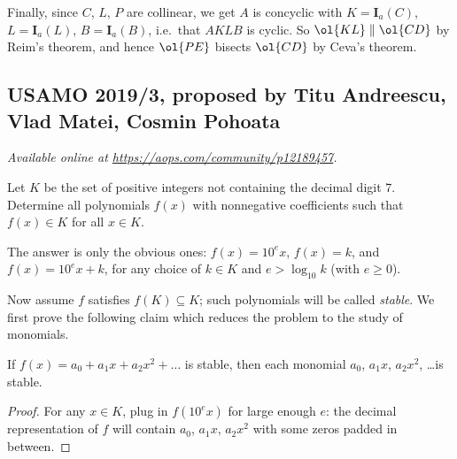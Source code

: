 \documentclass[11pt]{scrartcl}
\begin{document}
Finally, since $C$, $L$, $P$ are collinear,
we get $A$ is concyclic with $K = \mathbf{I}_a(C)$,
$L = \mathbf{I}_a(L)$, $B = \mathbf{I}_a(B)$, i.e.\ that $AKLB$ is cyclic.
So $\ol{KL} \parallel \ol{CD}$ by Reim's theorem,
and hence $\ol{PE}$ bisects $\ol{CD}$ by Ceva's theorem.
\pagebreak

\subsection{USAMO 2019/3, proposed by Titu Andreescu, Vlad Matei, Cosmin Pohoata}
\textsl{Available online at \url{https://aops.com/community/p12189457}.}
\begin{mdframed}[style=mdpurplebox,frametitle={Problem statement}]
Let $K$ be the set of positive integers not containing the decimal digit $7$.
Determine all polynomials $f(x)$ with nonnegative coefficients
such that $f(x) \in K$ for all $x \in K$.
\end{mdframed}
The answer is only the obvious ones:
$f(x) = 10^e x$, $f(x) = k$,
and $f(x) = 10^e x + k$, for any choice of $k \in K$
and $e > \log_{10} k$ (with $e \ge 0$).

Now assume $f$ satisfies $f(K) \subseteq K$;
such polynomials will be called \emph{stable}.
We first prove the following claim
which reduces the problem to the study of monomials.
\begin{lemma*}
  If $f(x) = a_0 + a_1 x + a_2 x^2 + \dots$ is stable,
  then each monomial $a_0$, $a_1 x$, $a_2 x^2$, \dots is stable.
\end{lemma*}
\begin{proof}
  For any $x \in K$, plug in $f(10^e x)$ for large enough $e$:
  the decimal representation of $f$ will contain
  $a_0$, $a_1 x$, $a_2 x^2$ with some zeros padded in between.
\end{proof}
\end{document}
